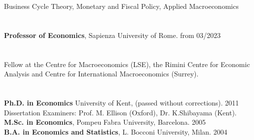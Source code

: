 \documentclass[margin, 11pt]{res} %
\begin{document}
\begin{resume}

\section{}
Business Cycle Theory, Monetary and Fiscal Policy, Applied Macroeconomics\\


\section{}
\textbf{Professor of Economics}, Sapienza University of Rome. \hfill  from 03/2023\\


\section{}
Fellow at the Centre for Macroeconomics (LSE), the Rimini Centre for Economic Analysis and Centre for International Macroeconomics (Surrey). \\

\section{}
\textbf{Ph.D. in Economics} University of Kent,  (passed without corrections). \hfill 2011 \\
\hspace*{5mm}Dissertation Examiners:  Prof. M. Ellison (Oxford), Dr. K.Shibayama (Kent).\\
\textbf{M.Sc. in Economics}, Pompeu Fabra University, Barcelona.    \hfill 2005\\
\textbf{B.A. in Economics and Statistics},  L. Bocconi University, Milan.   \hfill 2004


\end{resume}
\end{document}

